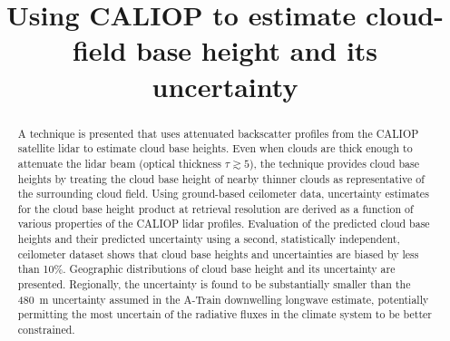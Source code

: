 \documentclass[essd,manuscript]{copernicus}\usepackage[]{graphicx}\usepackage[]{color}
\begin{document}

\title{Using CALIOP to estimate cloud-field base height and its uncertainty}













\received{}
\pubdiscuss{} %
\revised{}
\accepted{}
\published{}




\maketitle



\begin{abstract}
  A technique is presented that uses attenuated backscatter profiles
  from the CALIOP satellite lidar to estimate cloud base heights.  Even when
  clouds are thick enough to attenuate the lidar beam (optical thickness
  $\tau \gtrsim 5$), the technique provides cloud base heights by treating the
  cloud base height of nearby thinner clouds as representative of the
  surrounding cloud field.  Using ground-based ceilometer data, uncertainty
  estimates for the cloud base height product at retrieval resolution are
  derived as a function of various properties of the CALIOP lidar profiles.
  Evaluation of the predicted cloud base heights and their predicted uncertainty
  using a second, statistically independent, ceilometer dataset shows that cloud
  base heights and uncertainties are biased by less than 10\%.  Geographic
  distributions of cloud base height and its uncertainty are presented.
  Regionally, the uncertainty is found to be substantially smaller than the
  480~m uncertainty assumed in the A-Train downwelling longwave estimate,
  potentially permitting the most uncertain of the radiative fluxes in the
  climate system to be better constrained.
\end{abstract}
\end{document}
